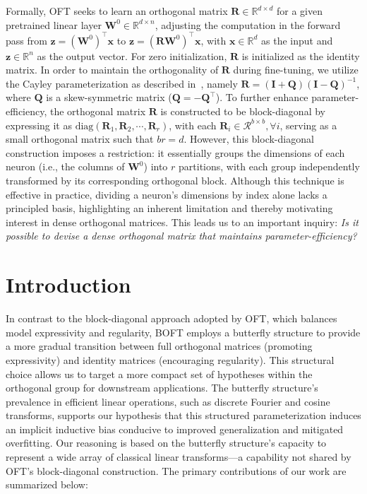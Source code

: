 Formally, OFT seeks to learn an orthogonal matrix $\bm{R}\in\mathbb{R}^{d\times d}$ for a given pretrained linear layer $\bm{W}^0\in\mathbb{R}^{d\times n}$, adjusting the computation in the forward pass from $\bm{z}=(\bm{W}^0)^\top\bm{x}$ to $\bm{z}=(\bm{R}\bm{W}^0)^\top\bm{x}$, with $\bm{x}\in\mathbb{R}^{d}$ as the input and $\bm{z}\in\mathbb{R}^{n}$ as the output vector. For zero initialization, $\bm{R}$ is initialized as the identity matrix. In order to maintain the orthogonality of $\bm{R}$ during fine-tuning, we utilize the Cayley parameterization as described in~\cite{qiu2023controlling,liu2021orthogonal}, namely $\bm{R}=(\bm{I}+\bm{Q})(\bm{I}-\bm{Q})^{-1}$, where $\bm{Q}$ is a skew-symmetric matrix ($\bm{Q}=-\bm{Q}^\top$). To further enhance parameter-efficiency, the orthogonal matrix $\bm{R}$ is constructed to be block-diagonal by expressing it as $\text{diag}(\bm{R}_1,\bm{R}_2,\cdots,\bm{R}_r)$, with each $\bm{R}_i\in\mathcal{R}^{b\times b}, \forall i$, serving as a small orthogonal matrix such that $br=d$. However, this block-diagonal construction imposes a restriction: it essentially groups the dimensions of each neuron (i.e., the columns of $\bm{W}^0$) into $r$ partitions, with each group independently transformed by its corresponding orthogonal block. Although this technique is effective in practice, dividing a neuron's dimensions by index alone lacks a principled basis, highlighting an inherent limitation and thereby motivating interest in dense orthogonal matrices. This leads us to an important inquiry: \emph{Is it possible to devise a dense orthogonal matrix that maintains parameter-efficiency?}

\section{Introduction}

In contrast to the block-diagonal approach adopted by OFT, which balances model expressivity and regularity, BOFT employs a butterfly structure to provide a more gradual transition between full orthogonal matrices (promoting expressivity) and identity matrices (encouraging regularity). This structural choice allows us to target a more compact set of hypotheses within the orthogonal group for downstream applications. The butterfly structure’s prevalence in efficient linear operations, such as discrete Fourier and cosine transforms, supports our hypothesis that this structured parameterization induces an implicit inductive bias conducive to improved generalization and mitigated overfitting. Our reasoning is based on the butterfly structure’s capacity to represent a wide array of classical linear transforms—a capability not shared by OFT’s block-diagonal construction. The primary contributions of our work are summarized below:

